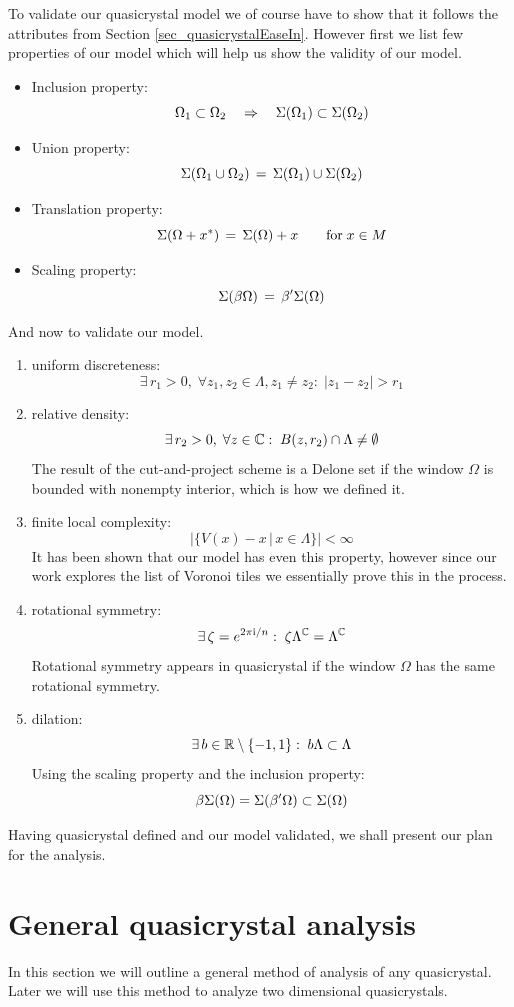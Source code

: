 \documentclass[text.tex]{subfiles}
\begin{document}
To validate our quasicrystal model we of course have to show that it follows the attributes from Section \ref{sec_quasicrystalEaseIn}. However first we list few properties of our model which will help us show the validity of our model. 

\begin{itemize}
\item Inclusion property: $$\Omega_1\subset\Omega_2 \quad\Rightarrow\quad \Sigma(\Omega_1)\subset\Sigma(\Omega_2)$$
\item Union property: $$\Sigma(\Omega_1\cup\Omega_2) \,=\, \Sigma(\Omega_1)\cup\Sigma(\Omega_2)$$
\item Translation property: $$\Sigma(\Omega+x^\ast) \,=\, \Sigma(\Omega)+x\qquad \text{for}\; x\in M$$
\item Scaling property: $$\Sigma(\beta\Omega) \,=\, \beta'\Sigma(\Omega)$$
\end{itemize}

And now to validate our model. 

\begin{enumerate}
\item uniform discreteness: $$\exists\,r_1>0,\; \forall z_1,z_2\in\Lambda, z_1\neq z_2:\; |z_1-z_2|>r_1$$
\item relative density: $$\exists\,r_2>0,\; \forall z\in\mathbb{C}:\; B(z,r_2)\cap\Lambda \neq \emptyset$$
The result of the cut-and-project scheme is a Delone set \cite{Lagarias} if the window $\Omega$ is bounded with nonempty interior, which is how we defined it. 
\item finite local complexity: $$\big|\{V(x)-x\,|\, x\in \Lambda\}\big|<\infty$$
It has been shown \cite{Lagarias} that our model has even this property, however since our work explores the list of Voronoi tiles we essentially prove this in the process. 
\item rotational symmetry: $$\exists\,\zeta = e^{2\pi \mathrm{i}/n}:\; \zeta\Lambda^{\mathbb{C}} = \Lambda^{\mathbb{C}}$$
Rotational symmetry appears in quasicrystal if the window $\Omega$ has the same rotational symmetry.
\item dilation: $$\exists\,b\in\mathbb{R}\setminus\{-1,1\}:\; b\Lambda\subset \Lambda$$
Using the scaling property and the inclusion property:
$$\beta\Sigma(\Omega) = \Sigma(\beta'\Omega) \subset \Sigma(\Omega)$$
\end{enumerate}

Having quasicrystal defined and  our model validated, we shall present our plan for the analysis. 

\section{General quasicrystal analysis}
In this section we will outline a general method of analysis of any quasicrystal. Later we will use this method to analyze two dimensional quasicrystals. 
\end{document}
